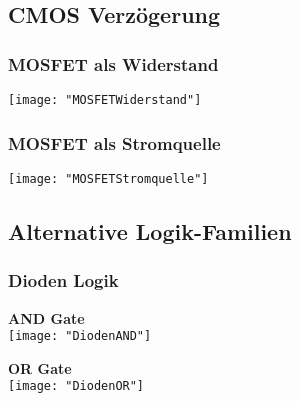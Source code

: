 \subsection{CMOS Verzögerung}
\begin{minipage}[t]{0.45\textwidth}
	\vspace{0pt}								%
	\subsubsection{MOSFET als Widerstand}
	\texttt{[image: "MOSFETWiderstand"]}
\end{minipage}\hspace{0.05\textwidth}
\begin{minipage}[t]{0.45\textwidth}
	\vspace{0pt}								%
	\subsubsection{MOSFET als Stromquelle}
	\texttt{[image: "MOSFETStromquelle"]}
\end{minipage}
\vspace{2mm}


\subsection{Alternative Logik-Familien}
\subsubsection{Dioden Logik}
\begin{minipage}[t]{0.34\textwidth}
	\vspace{0pt}
	\textbf{AND Gate}\\
	\texttt{[image: "DiodenAND"]}
\end{minipage}
\begin{minipage}[t]{0.34\textwidth}
	\vspace{0pt}
	\textbf{OR Gate}\\
	\texttt{[image: "DiodenOR"]}
\end{minipage}
\vspace{2mm}


